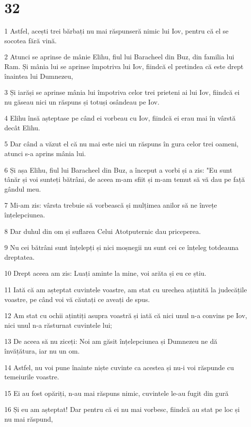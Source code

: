 \chapter{32}

\par 1 Astfel, acești trei bărbați nu mai răspunseră nimic lui Iov, pentru că el se socotea fără vină.
\par 2 Atunci se aprinse de mânie Elihu, fiul lui Baracheel din Buz, din familia lui Ram. Și mânia lui se aprinse împotriva lui Iov, fiindcă el pretindea că este drept înaintea lui Dumnezeu,
\par 3 Și iarăși se aprinse mânia lui împotriva celor trei prieteni ai lui Iov, fiindcă ei nu găseau nici un răspuns și totuși osândeau pe Iov.
\par 4 Elihu însă așteptase pe când ei vorbeau cu Iov, fiindcă ei erau mai în vârstă decât Elihu.
\par 5 Dar când a văzut el că nu mai este nici un răspuns în gura celor trei oameni, atunci s-a aprins mânia lui.
\par 6 Și așa Elihu, fiul lui Baracheel din Buz, a început a vorbi și a zis: "Eu sunt tânăr și voi sunteți bătrâni, de aceea m-am sfiit și m-am temut să vă dau pe față gândul meu.
\par 7 Mi-am zis: vârsta trebuie să vorbească și mulțimea anilor să ne învețe înțelepciunea.
\par 8 Dar duhul din om și suflarea Celui Atotputernic dau priceperea.
\par 9 Nu cei bătrâni sunt înțelepți și nici moșnegii nu sunt cei ce înțeleg totdeauna dreptatea.
\par 10 Drept aceea am zis: Luați aminte la mine, voi arăta și eu ce știu.
\par 11 Iată că am așteptat cuvintele voastre, am stat cu urechea ațintită la judecățile voastre, pe când voi vă căutați ce aveați de spus.
\par 12 Am stat cu ochii ațintiți asupra voastră și iată că nici unul n-a convins pe Iov, nici unul n-a răsturnat cuvintele lui;
\par 13 De aceea să nu ziceți: Noi am găsit înțelepciunea și Dumnezeu ne dă învățătura, iar nu un om.
\par 14 Astfel, nu voi pune înainte niște cuvinte ca acestea și nu-i voi răspunde cu temeiurile voastre.
\par 15 Ei au fost opăriți, n-au mai răspuns nimic, cuvintele le-au fugit din gură
\par 16 Și eu am așteptat! Dar pentru că ei nu mai vorbesc, fiindcă au stat pe loc și nu mai răspund,
